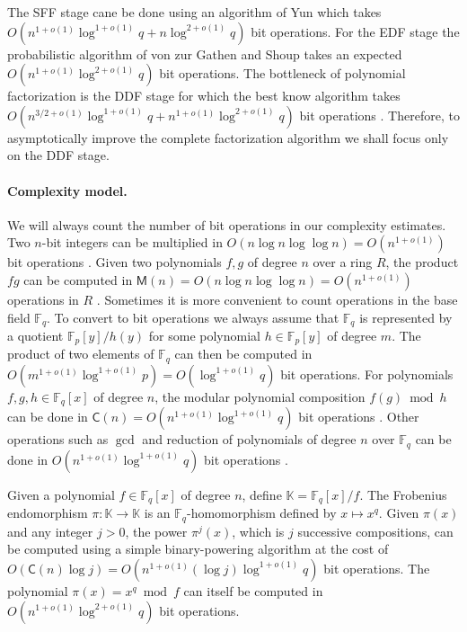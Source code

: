 \documentclass{article}
\theoremstyle{plain}
\theoremstyle{definition}
\def\K{\ensuremath{\mathbb{K}}}
\def\F{\ensuremath{\mathbb{F}}}
\def\MM{\ensuremath{\mathsf{M}}}
\def\CC{\ensuremath{\mathsf{C}}}
\begin{document}
The SFF stage cane be done using an algorithm of Yun \cite{yun1976square} which takes $O(n^{1 + 
o(1)}\log^{1 + o(1)}q + n\log^{2 + o(1)}q)$ bit operations. For the EDF stage the probabilistic 
algorithm of von zur Gathen and Shoup \cite{von1992computing} takes an expected $O(n^{1 + 
o(1)}\log^{2 + o(1)}q)$ bit operations. The bottleneck of polynomial factorization is the DDF 
stage for which the best know algorithm takes $O(n^{3/2 + o(1)}\log^{1 + o(1)}q + n^{1 + o(1)} 
\log^{2 + o(1)}q)$ bit operations \cite{kedlaya2011fast}. Therefore, to asymptotically improve the 
complete factorization algorithm we shall focus only on the DDF stage.

\paragraph{Complexity model.}
We will always count the number of bit operations in our complexity estimates. Two $n$-bit integers 
can be multiplied in $O(n\log n \log\log n) = O(n^{1 + o(1)})$ bit operations \cite{vzGG}. Given 
two polynomials $f, g$ of degree $n$ over a ring $R$, the product $fg$ can be computed in $\MM(n) = 
O(n\log n \log\log n) = O(n^{1 + o(1)})$ operations in $R$ \cite{vzGG}. Sometimes it is more 
convenient to count operations in the base field $\F_q$. To convert to bit operations we always 
assume that $\F_q$ is represented by a quotient $\F_p[y] / h(y)$ for some polynomial $h \in \F_p[y]$ 
of degree $m$. The product of two elements of $\F_q$ can then be computed in $O(m^{1 + o(1)}\log^{1 
+ o(1)}p) = O(\log^{1 + o(1)}q)$ bit operations. For polynomials $f, g, h \in \F_q[x]$ of degree 
$n$, the modular polynomial composition $f(g) \bmod h$ can be done in $\CC(n) = O(n^{1 + o(1)} 
\log^{1 + o(1)}q)$ bit operations \cite{kedlaya2011fast}. Other operations such as $\gcd$ and 
reduction of polynomials of degree $n$ over $\F_q$ can be done in $O(n^{1 + o(1)} \log^{1 + 
o(1)}q)$ bit operations \cite{vzGG}. 

Given a polynomial $f \in \F_q[x]$ of degree $n$, define $\K = \F_q[x] / f$. The Frobenius 
endomorphism $\pi: \K \rightarrow \K$ is an $\F_q$-homomorphism defined by $x \mapsto x^q$. Given 
$\pi(x)$ and any integer $j > 0$, the power $\pi^{j}(x)$, which is $j$ successive compositions, can 
be computed using a simple binary-powering algorithm at the cost of $O(\CC(n) \log j) = O(n^{1 + 
o(1)} (\log j) \log^{1 + o(1)}q)$ bit operations. The polynomial $\pi(x) = x^q \bmod f$ can itself 
be computed in $O(n^{1 + o(1)} \log^{2 + o(1)}q)$ bit operations.
\end{document}
